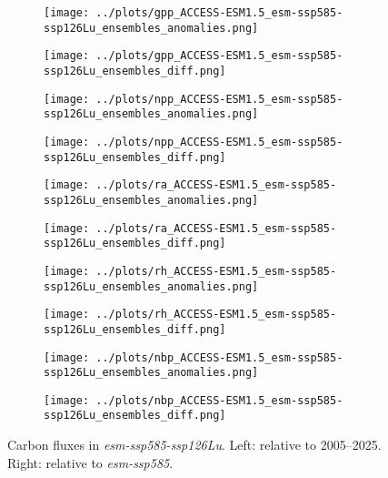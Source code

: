 \documentclass[]{article}
\begin{document}
\begin{figure}[H]
    \centering
    \begin{subfigure}[b]{0.4\linewidth}
        \texttt{[image: ../plots/gpp\_ACCESS-ESM1.5\_esm-ssp585-ssp126Lu\_ensembles\_anomalies.png]}
    \end{subfigure}
    \begin{subfigure}[b]{0.4\linewidth}
        \texttt{[image: ../plots/gpp\_ACCESS-ESM1.5\_esm-ssp585-ssp126Lu\_ensembles\_diff.png]}
    \end{subfigure}
    \begin{subfigure}[b]{0.4\linewidth}
        \texttt{[image: ../plots/npp\_ACCESS-ESM1.5\_esm-ssp585-ssp126Lu\_ensembles\_anomalies.png]}
    \end{subfigure}
    \begin{subfigure}[b]{0.4\linewidth}
        \texttt{[image: ../plots/npp\_ACCESS-ESM1.5\_esm-ssp585-ssp126Lu\_ensembles\_diff.png]}
    \end{subfigure}
    \begin{subfigure}[b]{0.4\linewidth}
        \texttt{[image: ../plots/ra\_ACCESS-ESM1.5\_esm-ssp585-ssp126Lu\_ensembles\_anomalies.png]}
    \end{subfigure}
    \begin{subfigure}[b]{0.4\linewidth}
        \texttt{[image: ../plots/ra\_ACCESS-ESM1.5\_esm-ssp585-ssp126Lu\_ensembles\_diff.png]}
    \end{subfigure}
    \begin{subfigure}[b]{0.4\linewidth}
        \texttt{[image: ../plots/rh\_ACCESS-ESM1.5\_esm-ssp585-ssp126Lu\_ensembles\_anomalies.png]}
    \end{subfigure}
    \begin{subfigure}[b]{0.4\linewidth}
        \texttt{[image: ../plots/rh\_ACCESS-ESM1.5\_esm-ssp585-ssp126Lu\_ensembles\_diff.png]}
    \end{subfigure}
    \begin{subfigure}[b]{0.4\linewidth}
        \texttt{[image: ../plots/nbp\_ACCESS-ESM1.5\_esm-ssp585-ssp126Lu\_ensembles\_anomalies.png]}
    \end{subfigure}
    \begin{subfigure}[b]{0.4\linewidth}
        \texttt{[image: ../plots/nbp\_ACCESS-ESM1.5\_esm-ssp585-ssp126Lu\_ensembles\_diff.png]}
    \end{subfigure}
    \caption{Carbon fluxes in \textit{esm-ssp585-ssp126Lu}.  Left: relative to 2005--2025. Right: relative to \textit{esm-ssp585}.}
    \label{fig:access_cflux}
\end{figure}
\end{document}
